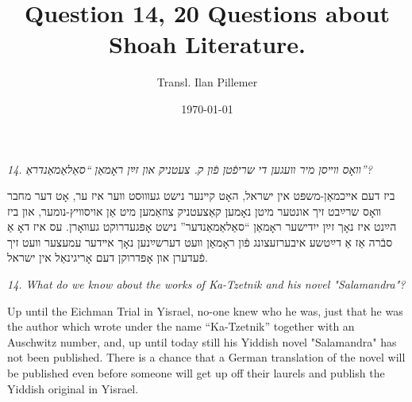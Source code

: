 \documentclass{article}
\begin{document}
\renewcommand{\abstractname}{\vspace{-\baselineskip}}
\title{Question 14, 20 Questions about Shoah Literature.}
\author{Transl. Ilan Pillemer}
\date{\today}

\maketitle
{}
\newline

\begin{pairs}

\begin{Rightside}

\begin{RTL}
\begin{hebrew}
\beginnumbering
\autopar
\emph{
14.
װאָס װײסן מיר װעגען די שריפֿטן פֿון ק. צעטניק און זײַן ראָמאַן ``סאַלאַמאַנדראַ''?
}
\newline

ביז דעם אײכמאַן-משפּט אין ישראל, האָט קײנער נישט געװוּסט װער איז ער, אָט דער מחבר װאָס שרײַבט זיך אונטער מיטן נאָמען קאַצעטניק צוזאַמען מיט אַן אויסװיץ-נומער,
און ביז הײַנט איז נאָך זײַן ייִדישער ראָמאַן ``סאַלאַמאַנדער'' נישט אָפּגעדרוקט געװאָרן.
עס איז דאָ אַ סבֿרה אַז אַ דײַטשע איבערזעצונג פֿון ראָמאַן װעט דערשײַנען נאָך אײדער עמעצער װעט זיך פֿעדערן און אָפּדרוקן דעם אָריגינאַל אין ישראל.

\endnumbering
\end{hebrew}
\end{RTL}
\end{Rightside}


\begin{Leftside}
\begin{english}
\beginnumbering
\autopar
\emph{
14.
What do we know about the works of Ka-Tzetnik  and his novel "Salamandra"?
}
 
 Up until the Eichman Trial in Yisrael, no-one knew who he was, just that he was the author which wrote under the name 
 ``Ka-Tzetnik''
together with an Auschwitz number, and, up until today still his Yiddish novel "Salamandra" has not been published.
There is a chance that a German translation of the novel will be published even before someone
will get up off their laurels and publish the Yiddish original in Yisrael.
 
\endnumbering
\end{english}
\end{Leftside}

\end{pairs}
\Columns
\end{document}
